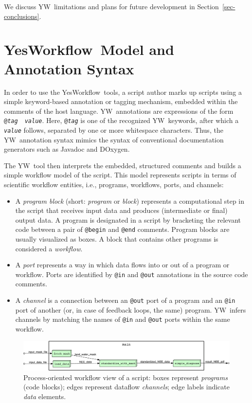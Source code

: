 \documentclass[15]{idcc}
\newcommand{\YW}{\textsf{YesWorkflow}}
\newcommand{\yw}{\textsf{YW}}
\newcommand{\YWT}{YesWorkflow}
\newcommand{\ywa}[1]{\texttt{\small #1}}
\begin{document}
 \noindent We discuss \yw\ limitations and plans for future
 development in Section~\ref{sec-conclusions}.


\section{\YWT\ Model and Annotation Syntax}\label{sec-ywmodel}

In order to use the \YW\ tools, a script author marks up scripts using
a simple keyword-based annotation or tagging mechanism, embedded
within the comments of the host language. \yw\ annotations are
expressions of the form
\ywa{@\emph{tag}}~\textvisiblespace~\ywa{\emph{value}}. Here,
\ywa{@\emph{tag}} is one of the recognized \yw\ keywords, after which a
\ywa{\emph{value}} follows, separated by one or more whitespace
characters. Thus, the \yw\ annotation syntax mimics the syntax of
conventional documentation generators such as Javadoc and DOxygen.

The \yw\ tool then interprets the embedded, structured comments and
builds a simple workflow model of the script. This model represents
scripts in terms of scientific workflow entities, i.e., programs,
workflows, ports, and channels:

\begin{itemize}
\item A \emph{program block} (short: \emph{program} or \emph{block})
  represents a computational step in the script that receives input
  data and produces (intermediate or final) output data. A program is
  designated in a script by bracketing the relevant code between a
  pair of \ywa{@begin} and \ywa{@end} comments. Program blocks are
  usually visualized as boxes. A block that contains other programs is
  considered a \emph{workflow}. \item A \emph{port} represents a way
  in which data flows into or out of a program or workflow. Ports are
  identified by \ywa{@in} and \ywa{@out} annotations in the source
  code comments.
\item A \emph{channel} is a connection between an \ywa{@out} port
of a program and an \ywa{@in} port of another (or, in case of feedback
loops, the same) program. \yw\ infers
channels by matching the names of \ywa{@in} and \ywa{@out} 
ports within the same workflow.
\end{itemize}

 \begin{figure}[t]
   \centering
   \includegraphics[width=1.0\textwidth]{figures/example_process-crop.pdf}
   \caption{Process-oriented workflow view of a script: boxes
     represent \emph{programs} (code blocks); edges represent dataflow
     \emph{channels}; edge labels indicate \emph{data}
     elements.}
   \label{fig-simple-process}
 \end{figure}
\end{document}
